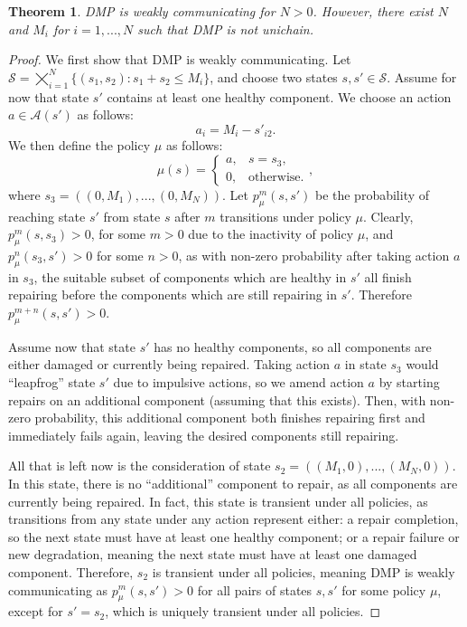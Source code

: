 \documentclass[11pt,authoryear,a4paper]{article}
\newtheorem{theorem}{Theorem}
\theoremstyle{definition}
\begin{document}
\begin{theorem}
    DMP is weakly communicating for $N>0$. However, there exist $N$ and $M_i$ for $i=1,...,N$ such that DMP is not unichain.
\end{theorem}
\begin{proof}
    We first show that DMP is weakly communicating. Let $\mathcal{S} = \bigtimes_{i=1}^N \{(s_1,s_2):s_1+s_2\leq M_i\}$, and choose two states $s,s'\in\mathcal{S}$. Assume for now that state $s'$ contains at least one healthy component. We choose an action $a\in\mathcal{A}(s')$ as follows:
    $$a_i = M_i - s'_{i2}.$$
    We then define the policy $\mu$ as follows:
    $$\mu(s) = \left\{\begin{array}{cc}
         a, & s=s_3,\\
         0, & \text{otherwise.}
    \end{array}\right.,$$
    where $s_3 = ((0,M_1),...,(0,M_N))$. Let $p_\mu^m(s,s')$ be the probability of reaching state $s'$ from state $s$ after $m$ transitions under policy $\mu$. Clearly, $p_\mu^m(s,s_3) > 0$, for some $m>0$ due to the inactivity of policy $\mu$, and $p_\mu^n(s_3, s') > 0$ for some $n>0$, as with non-zero probability after taking action $a$ in $s_3$, the suitable subset of components which are healthy in $s'$ all finish repairing before the components which are still repairing in $s'$. Therefore $p_\mu^{m+n}(s,s') > 0$.

    Assume now that state $s'$ has no healthy components, so all components are either damaged or currently being repaired. Taking action $a$ in state $s_3$ would ``leapfrog'' state $s'$ due to impulsive actions, so we amend action $a$ by starting repairs on an additional component (assuming that this exists). Then, with non-zero probability, this additional component both finishes repairing first and immediately fails again, leaving the desired components still repairing.

    All that is left now is the consideration of state $s_2 = ((M_1,0),...,(M_N,0))$. In this state, there is no ``additional'' component to repair, as all components are currently being repaired. In fact, this state is transient under all policies, as transitions from any state under any action represent either: a repair completion, so the next state must have at least one healthy component; or a repair failure or new degradation, meaning the next state must have at least one damaged component. Therefore, $s_2$ is transient under all policies, meaning DMP is weakly communicating as $p_\mu^m(s,s') > 0$ for all pairs of states $s,s'$ for some policy $\mu$, except for $s'=s_2$, which is uniquely transient under all policies. 


\end{proof}
\end{document}
